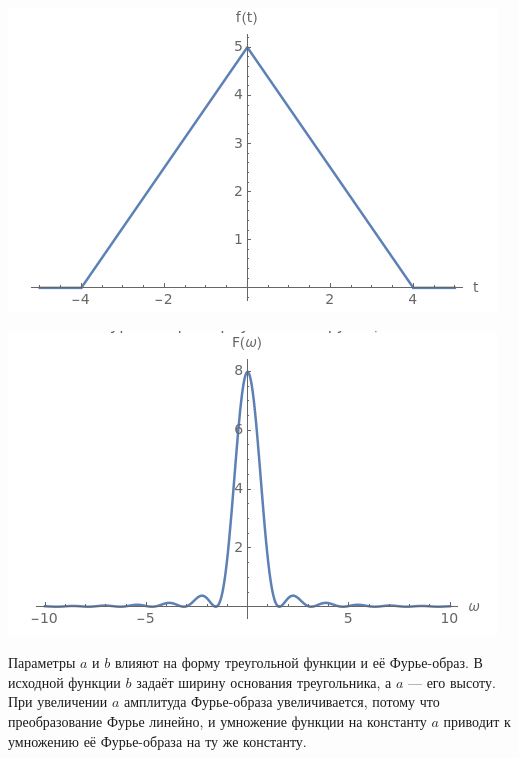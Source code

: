 \documentclass[a4paper,12pt]{article}
\begin{document}
\begin{center}
\begin{minipage}{0.48\textwidth}
  \centering
  \includegraphics[width=\linewidth]{images/2f54.png}
\end{minipage}
\hfill
\begin{minipage}{0.48\textwidth}
  \centering
  \includegraphics[width=\linewidth]{images/2F54.png}
\end{minipage}
\end{center}

Параметры \( a \) и \( b \) влияют на форму треугольной функции и её Фурье-образ. В исходной функции \( b \) задаёт ширину основания треугольника, а \( a \) — его высоту. При увеличении \( a \) амплитуда Фурье-образа увеличивается, потому что преобразование Фурье линейно, и умножение функции на константу \( a \) приводит к умножению её Фурье-образа на ту же константу.
\end{document}

